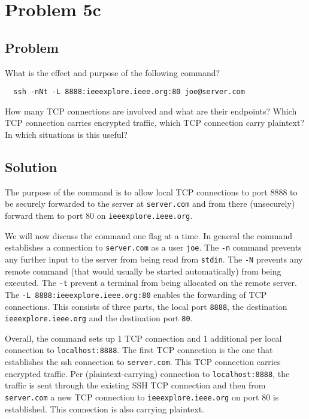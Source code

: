 \documentclass[a4paper,10pt]{article}
\begin{document}
\section{Problem 5c}

\subsection{Problem}

What is the effect and purpose of the following command? \begin{lstlisting}
  ssh -nNt -L 8888:ieeexplore.ieee.org:80 joe@server.com
\end{lstlisting} How many TCP connections are involved and what are their endpoints? Which TCP connection carries encrypted traffic, which TCP connection carry plaintext? In which situations is this useful?

\subsection{Solution}
The purpose of the command is to allow local TCP connections to port 8888 to be securely forwarded to the server at \texttt{server.com} and from there (unsecurely) forward them to port 80 on \texttt{ieeexplore.ieee.org}.

We will now discuss the command one flag at a time.
In general the command establishes a connection to \texttt{server.com} as a user \texttt{joe}.
The \texttt{-n} command prevents any further input to the server from being read from \texttt{stdin}.
The \texttt{-N} prevents any remote command (that would usually be started automatically) from being executed.
The \texttt{-t} prevent a terminal from being allocated on the remote server.
The \texttt{-L 8888:ieeexplore.ieee.org:80} enables the forwarding of TCP connections.
This consists of three parts, the local port \texttt{8888}, the destination \texttt{ieeexplore.ieee.org} and the destination port \texttt{80}.

Overall, the command sets up 1 TCP connection and 1 additional per local connection to \texttt{localhost:8888}.
The first TCP connection is the one that establishes the ssh connection to \texttt{server.com}.
This TCP connection carries encrypted traffic.
Per (plaintext-carrying) connection to \texttt{localhost:8888}, the traffic is sent through the existing SSH TCP connection and then from \texttt{server.com} a new TCP connection to \texttt{ieeexplore.ieee.org} on port 80 is established.
This connection is also carrying plaintext.
\end{document}
